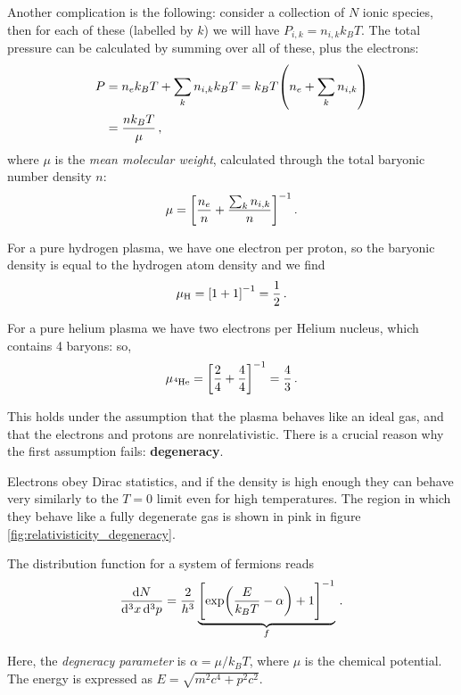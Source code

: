 \documentclass[main.tex]{subfiles}
\begin{document}
Another complication is the following: consider a collection of \(N\) ionic species, then for each of these (labelled by \(k\)) we will have \(P_{i, k}= n_{i, k} k_B T\). 
The total pressure can be calculated by summing over all of these, plus the electrons: 
%
\begin{align}
P &= n_e k_B T + \sum _{k} n_{i, k} k_B T = k_B T \qty(n_e + \sum_k n_{i, k})  \\
&= \frac{nk_B T}{\mu }
\,,
\end{align}
%
where \(\mu \) is the \emph{mean molecular weight}, calculated through the total baryonic number density \(n\): 
%
\begin{align}
\mu = \qty[\frac{n_e}{n} + \frac{\sum _{k} n_{i, k}}{n} ]^{-1}
\,.
\end{align}

For a pure hydrogen plasma, we have one electron per proton, so the baryonic density is equal to the hydrogen atom density and we find 
%
\begin{align}
\mu_{\ce{H}} = \qty[1 + 1]^{-1} = \frac{1}{2}
\,.
\end{align}

For a pure helium plasma we have two electrons per Helium nucleus, which contains 4 baryons: so, 
%
\begin{align}
\mu_{\ce{^{4}He}} = \qty[ \frac{2}{4} + \frac{4}{4}]^{-1} = \frac{4}{3}
\,.
\end{align}

This holds under the assumption that the plasma behaves like an ideal gas, and that the electrons and protons are nonrelativistic. 
There is a crucial reason why the first assumption fails: \textbf{degeneracy}.

Electrons obey Dirac statistics, and if the density is high enough they can behave very similarly to the \(T = 0\) limit even for high temperatures. The region in which they behave like a fully degenerate gas is shown in pink in figure \ref{fig:relativisticity_degeneracy}. 

The distribution function for a system of fermions reads 
%
\begin{align}
\frac{ \dd{N}}{ \dd[3]{x} \dd[3]{p}} = \frac{2}{h^3} \underbrace{\qty[\exp(\frac{E }{k_B T} - \alpha ) + 1]^{-1}}_{f}
\,.
\end{align}

Here, the \emph{degneracy parameter} is \(\alpha = \mu / k_B T\), where \(\mu  \) is the chemical potential. 
The energy is expressed as \(E = \sqrt{m^2 c^{4} + p^2 c^2}\).
\end{document}
